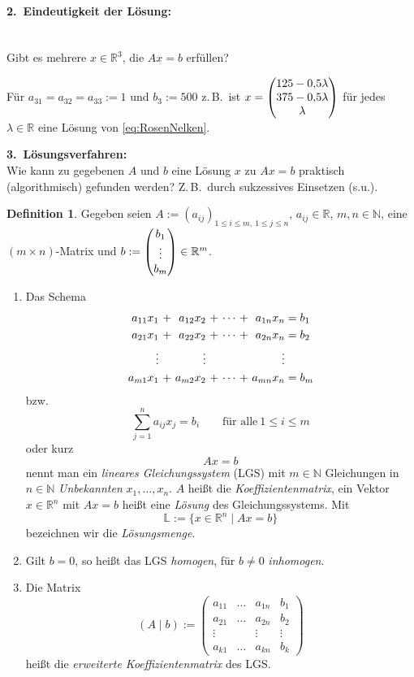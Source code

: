\documentclass[a4paper,11pt,oneside]{article}
\theoremstyle{definition}
\newtheorem{definition}{Definition}
\begin{document}
\paragraph{2.\ Eindeutigkeit der Lösung:}~\\
Gibt es mehrere $x\in\mathbb R^3$, die $Ax=b$ erfüllen?

Für $a_{31}=a_{32}=a_{33}:=1$ und $b_3:=500$ z.\,B.\ ist $x=\begin{pmatrix}125-0{,}5\lambda \cr 375-0{,}5\lambda \cr \lambda \end{pmatrix}$ für jedes $\lambda\in\mathbb R$ eine Lösung von \eqref{eq:RosenNelken}.

\textbf{3.\ Lösungsverfahren:}~\\
Wie kann zu gegebenen $A$ und $b$ eine Lösung $x$ zu $ Ax=b$ praktisch (algorithmisch) gefunden werden? Z.\,B.\ durch sukzessives Einsetzen (s.u.).

\begin{definition}\label{Def:LGS}
Gegeben seien $A:=(a_{ij})_{1\le i\le m,\ 1\le j\le n}$, $a_{ij}\in\mathbb R$, $m,n\in\mathbb N$, eine $(m\times n)$-Matrix und $b:=\begin{pmatrix}b_1\cr\vdots\cr b_m\end{pmatrix}\in\mathbb R^m$.
\begin{enumerate}
\item
Das Schema
$$
\begin{alignedat}{4}
a_{11}x_1&\ +\ &a_{12}x_2&\ +\ & \cdots &\ +\ &a_{1n}x_n &=b_1\\
a_{21}x_1&\ +\ &a_{22}x_2&\ +\ & \cdots &\ +\ &a_{2n}x_n &=b_2\\
\vdots &&\vdots &&&&\vdots&\cr
a_{m1}x_1&\ +\ &a_{m2}x_2&\ +\ & \cdots &\ +\ &a_{mn}x_n &=b_m
\end{alignedat}
$$
bzw.
$$
\sum _{j=1}^n a_{ij}x_j=b_i\qquad \text{für alle}~ 1\leq i\leq m
$$
oder kurz
$$
Ax=b
$$
nennt man ein \emph{lineares Gleichungssystem} (LGS) mit $m\in\mathbb N$ Gleichungen in $n\in\mathbb N$ \emph{Unbekannten} $x_1,\ldots,x_n$. $A$ heißt die \emph{Koeffizientenmatrix}, ein Vektor $x\in\mathbb R^n$ mit $Ax=b$ heißt eine \emph{Lösung} des Gleichungssystems. Mit
$$
{\mathbb L}:=\{x\in\mathbb R^n\mid Ax=b\}
$$
bezeichnen wir die \emph{Lösungsmenge}.
\item
Gilt $b=0$, so heißt das LGS \emph{homogen}, für $b\ne0$ \emph{inhomogen}.
\item
Die Matrix
$$
(A\mid b)
:=\left(\begin{array}{ccc|c}
a_{11}&\ldots& a_{1n}& b_1\\
a_{21}&\ldots&a_{2n}& b_2\\
\vdots &&\vdots &\vdots \\
a_{k1}&\ldots &a_{kn}& b_k
\end{array}\right)
$$
heißt die \emph{erweiterte Koeffizientenmatrix} des LGS.
\end{enumerate}
\end{definition}
\end{document}
